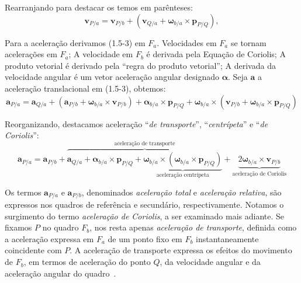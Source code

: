 Rearranjando para destacar os temos em parênteses\footnotemark{}:
\begin{equation*}
    \mathbf{v}_{P/a} = \mathbf{v}_{P/b} + \left( \mathbf{v}_{Q/a} + \mathbf{\omega}_{b/a}\!\times\!\mathbf{p}_{P/Q} \right),
\end{equation*}

Para a aceleração derivamos (1.5-3) em \(F_{a}\). Velocidades em \(F_{a}\) se tornam acelerações em \(F_{a}\); A velocidade em \(F_{b}\) é derivada pela Equação de Coriolis; A produto vetorial é derivado pela ``regra do produto vetorial''; A derivada da velocidade angular é um vetor aceleração angular designado \(\mathbf{\alpha}\). Seja \(\mathbf{a}\) a aceleração translacional em (1.5-3), obtemos:
\begin{equation*}
    \mathbf{a}_{P/a} = \mathbf{a}_{Q/a} + \left(\mathbf{a}_{P/b} + \mathbf{\omega}_{b/a}\!\times\!\mathbf{v}_{P/b}\right) + {{\mathbf{\alpha}_{b/a}}\!\times\!{\mathbf{p}_{P/Q}}} + {\mathbf{\omega}_{b/a}}\!\times\!{\left({\mathbf{v}_{P/b}} + {{\mathbf{\omega}_{b/a}}\!\times\!{\mathbf{p}_{P/Q}}}\right)}
\end{equation*}

Reorganizando, destacamos aceleração ``\emph{de transporte}'', ``\emph{centrípeta}'' e ``\emph{de Coriolis}'':
\begin{equation*}
    \mathbf{a}_{P/a} = \mathbf{a}_{P/b} + \overbrace{\mathbf{a}_{Q/a} + {{\mathbf{\alpha}_{b/a}}\!\times\!{\mathbf{p}_{P/Q}}} + \underbrace{{{\mathbf{\omega}_{b/a}}\!\times\!{\left({\mathbf{\omega}_{b/a}}\!\times\!{\mathbf{p}_{P/Q}}\right)}}}_{\text{aceleração centrípeta}}}^{\text{aceleração de transporte}} + \underbrace{{2\mathbf{\omega}_{b/a}\!\times\!\mathbf{v}_{P/b}}}_{\text{aceleração de Coriolis}} \tag{1.5-4}
\end{equation*}


Os termos \(\mathbf{a}_{P/a}\) e \(\mathbf{a}_{P/b}\), denominados \emph{aceleração total} e \emph{aceleração relativa}, são expressos nos quadros de referência e secundário, respectivamente. Notamos o surgimento do termo \textit{aceleração de Coriolis}, a ser examinado mais adiante. Se fixamos \(P\) no quadro \(F_{b}\), nos resta apenas \textit{aceleração de  transporte}, definida como a aceleração expressa em \(F_{a}\) de um ponto fixo em \(F_{b}\) instantaneamente coincidente com \(P\). A aceleração de transporte expressa os efeitos do movimento de \(F_{b}\), em termos de aceleração do ponto \(Q\), da velocidade angular e da aceleração angular do quadro~\cite{Stevens2016}.


